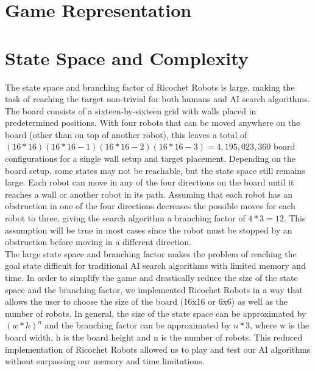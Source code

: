 \documentclass[a4paper,10pt]{article}
\begin{document}


\section{Game Representation}


\section{State Space and Complexity}
\label{sec:stateSpace}
The state space and branching factor of Ricochet Robots is large, making the task of reaching the target non-trivial for both humans and AI search algorithms.
The board consists of a sixteen-by-sixteen grid with walls placed in predetermined positions.  With four robots that can be moved anywhere on the board (other
than on top of another robot), this leaves a total of $(16*16)(16*16-1)(16*16-2)(16*16-3) = 4,195,023,360$ board configurations for a single wall setup and
target placement.  Depending on the board setup, some states may not be reachable, but the state space still remains large. Each robot can move in any of the
four directions on the board until it reaches a wall or another robot in its path.  Assuming that each robot has an obstruction in one of the four directions
decreases the possible moves for each robot to three, giving the search algorithm a branching factor of $4*3 = 12$.  This assumption will be true in most cases since
the robot must be stopped by an obstruction before moving in a different direction. \\

The large state space and branching factor makes the problem of reaching the goal state difficult for traditional AI search algorithms with limited memory and time.
In order to simplify the game and drastically reduce the size of the state space and the branching factor, we implemented Ricochet Robots in a way that allows the
user to choose the size of the board (16x16 or 6x6) as well as the number of robots. In general, the size of the state space can be approximated by $(w*h)^n$ and
the branching factor can be approximated by $n*3$, where w is the board width, h is the board height and n is the number of robots.  This reduced implementation of Ricochet Robots allowed us to play and test our AI algorithms without surpassing our memory and time limitations.
\end{document}
